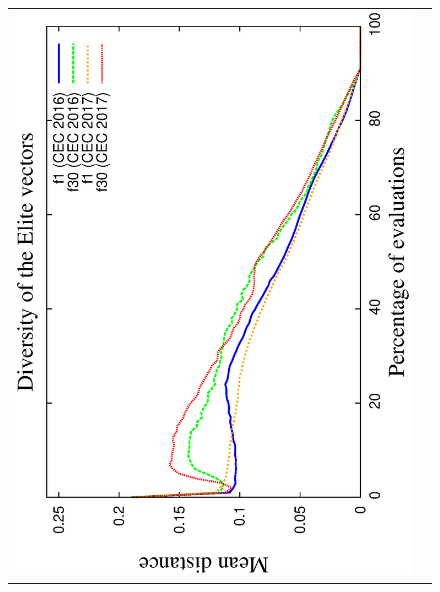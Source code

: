 \begin{figure}[t]
\centering
\begin{tabular}{cc}
   \includegraphics[scale=0.23, angle=-90]{img/Diversity_Elite.eps} 

\end{tabular}
\end{figure}
